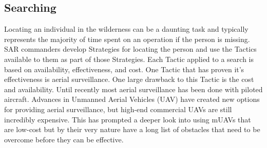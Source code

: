 \subsection{Searching}
Locating an individual in the wilderness can be a daunting task and typically
represents the majority of time spent on an operation if the person is missing.
SAR commanders develop Strategies for locating the person and use the Tactics
available to them as part of those Strategies.  Each Tactic applied to a search
is based on availability, effectiveness, and cost.  One Tactic that has proven
it's effectiveness is aerial surveillance.  One large drawback to this Tactic is
the cost and availability.  Until recently most aerial surveillance has been
done with piloted aircraft.  Advances in Unmanned Aerial Vehicles (UAV) have
created new options for providing aerial surveillance, but high-end
commercial UAVs are still incredibly expensive.  This has prompted a deeper
look into using mUAVs that are low-cost but by their very nature have a long
list of obstacles that need to be overcome before they can be effective.

